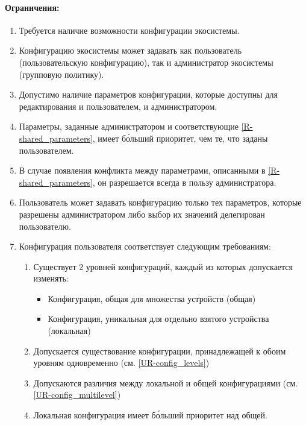 \paragraph*{Ограничения:}
\begin{enumerate}[label={\bfseries О-\arabic*.}]
   \item Требуется наличие возможности конфигурации экосистемы.
   \item Конфигурацию экосистемы может задавать как пользователь (пользовательскую конфигурацию), так и администратор экосистемы (групповую политику).
   \item Допустимо наличие параметров конфигурации, которые доступны для редактирования и пользователем, и администратором.
         \label{R-shared_parameters}
   \item Параметры, заданные администратором и соответствующие \ref{R-shared_parameters}, имеет б\'{о}льший приоритет, чем те, что заданы пользователем.
         \label{R-parameters_types}
   \item В случае появления конфликта между параметрами, описанными в \ref{R-shared_parameters}, он разрешается всегда в пользу администратора.
   \item Пользователь может задавать конфигурацию только тех параметров, которые разрешены администратором либо выбор их значений делегирован пользователю.
   \item Конфигурация пользователя соответствует следующим требованиям:
         \begin{enumerate}[label*={\bfseries\arabic*.}]
            \item Существует 2 уровней конфигураций, каждый из которых допускается изменять:
                  \begin{itemize}
                     \item Конфигурация, общая для множества устройств (общая)
                     \item Конфигурация, уникальная для отдельно взятого устройства (локальная)
                           \label{UR-config_levels}
                  \end{itemize}
            \item Допускается существование конфигурации, принадлежащей к обоим уровням одновременно (см. \ref{UR-config_levels})
                  \label{UR-config_multilevel}
            \item Допускаются различия между локальной и общей конфигурациями (см. \ref{UR-config_multilevel})
            \item Локальная конфигурация имеет б\'{о}льший приоритет над общей.

\end{enumerate}
\end{enumerate}
